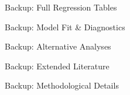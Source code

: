 \documentclass[aspectratio=169,11pt]{beamer}
\begin{document}
\appendix

\begin{frame}{Backup: Full Regression Tables}
\end{frame}

\begin{frame}{Backup: Model Fit \& Diagnostics}
\end{frame}

\begin{frame}{Backup: Alternative Analyses}
\end{frame}

\begin{frame}{Backup: Extended Literature}
\end{frame}

\begin{frame}{Backup: Methodological Details}
\end{frame}
\end{document}

